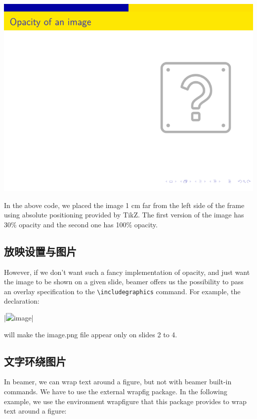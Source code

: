 \begin{column}{0.5\textwidth}
\includegraphics[page=2]{examples/beamer/beamerfigure08.pdf}

In the above code, we placed the image 1 cm far from the left side of the frame using absolute positioning provided by TikZ. The first version of the image has 30\% opacity and the second one has 100\% opacity.

\subsection{放映设置与图片}

However, if we don’t want such a fancy implementation of opacity, and just want the image to be shown on a given slide, beamer offers us the possibility to pass an overlay specification to the \verb|\includegraphics| command. For example, the declaration:

|\includegraphics<2-4>[width=\textwidth]{image.png}|

will make the image.png file appear only on slides 2 to 4. 

\subsection{文字环绕图片}

In beamer, we can wrap text around a figure, but not with beamer built-in commands. We have to use the external wrapfig package. In the following example, we use the environment wrapfigure that this package provides to wrap text around a figure:

\inputminted[linenos=true]{latex}{examples/beamer/beamerfigure09.tex}


\end{column}
